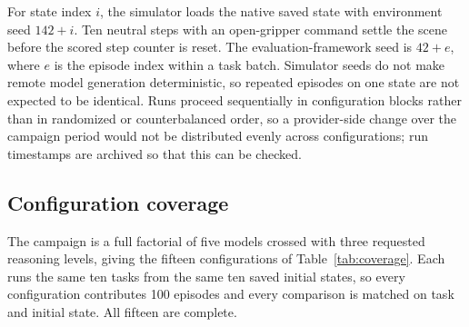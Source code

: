 \documentclass[11pt]{article}
\begin{document}
For state index $i$, the simulator loads the native saved state with
environment seed $142+i$. Ten neutral steps with an open-gripper command settle
the scene before the scored step counter is reset. The evaluation-framework
seed is $42+e$, where $e$ is the episode index within a task batch.
Simulator seeds do not make remote model generation deterministic, so repeated
episodes on one state are not expected to be identical. Runs proceed
sequentially in configuration blocks rather than in randomized or
counterbalanced order, so a provider-side change over the campaign period would
not be distributed evenly across configurations; run timestamps are archived so
that this can be checked.

\subsection{Configuration coverage}
\label{sec:coverage}
The campaign is a full factorial of five models crossed with three requested
reasoning levels, giving the fifteen configurations of
Table~\ref{tab:coverage}. Each runs the same ten tasks from the same ten saved
initial states, so every configuration contributes 100 episodes and every
comparison is matched on task and initial state. All fifteen are complete.
\end{document}
